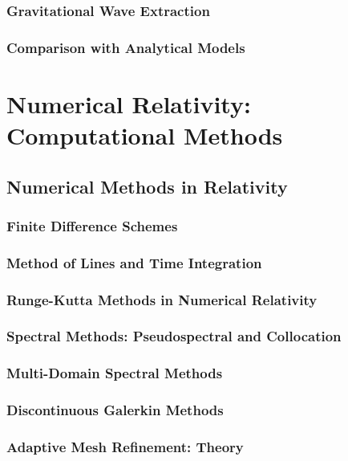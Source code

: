 \section{Gravitational Wave Extraction}\label{sec:gravitational-wave-extraction}
\section{Comparison with Analytical Models}\label{sec:comparison-with-analytical-models}

\part{Numerical Relativity: Computational Methods}\label{part:numerical-relativity:-computational-methods}
\chapter{Numerical Methods in Relativity}\label{ch:numerical-methods-in-relativity}
\section{Finite Difference Schemes}\label{sec:finite-difference-schemes}
\section{Method of Lines and Time Integration}\label{sec:method-of-lines-and-time-integration}
\section{Runge-Kutta Methods in Numerical Relativity}\label{sec:runge-kutta-methods-in-numerical-relativity}
\section{Spectral Methods: Pseudospectral and Collocation}\label{sec:-pseudospectral-and-collocation}
\section{Multi-Domain Spectral Methods}\label{sec:multi-domain-spectral-methods}
\section{Discontinuous Galerkin Methods}\label{sec:discontinuous-galerkin-methods}
\section{Adaptive Mesh Refinement: Theory}\label{sec:-theory}
